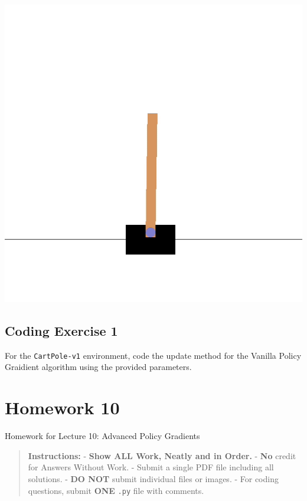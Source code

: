 \documentclass[
  letterpaper,
  DIV=11,
  numbers=noendperiod]{scrreprt}
\makeatletter
\newcommand*\pandocbounded[1]{%
  \sbox\pandoc@box{#1}%
  \Gscale@div\@tempa{\textheight}{\dimexpr\ht\pandoc@box+\dp\pandoc@box\relax}%
  \Gscale@div\@tempb{\linewidth}{\wd\pandoc@box}%
  \ifdim\@tempb\p@<\@tempa\p@\let\@tempa\@tempb\fi%
  \ifdim\@tempa\p@<\p@\scalebox{\@tempa}{\usebox\pandoc@box}%
  \else\usebox{\pandoc@box}%
  \fi%
}
\makeatother
\begin{document}
\begin{center}
\includegraphics[width=0.4\linewidth,height=\textheight,keepaspectratio]{homework/images/cartpole.gif}
\end{center}

\section{Coding Exercise 1}\label{coding-exercise-1-6}

For the \texttt{CartPole-v1} environment, code the update method for the
Vanilla Policy Graidient algorithm using the provided parameters.

\section{\texorpdfstring{\href{https://colab.research.google.com/drive/1Y_A4uKoSmjc6EmU-Or7tbeo3fe_ZD4RH?usp=sharing}{\protect\pandocbounded{}}}{}}\label{section-7}

\chapter{Homework 10}\label{homework-10}

\begin{tcolorbox}[enhanced jigsaw, colback=white, left=2mm, breakable, opacityback=0, bottomrule=.15mm, rightrule=.15mm, arc=.35mm, colframe=quarto-callout-note-color-frame, leftrule=.75mm, toprule=.15mm]

Homework for Lecture 10: Advanced Policy Gradients 📝

\end{tcolorbox}

\begin{quote}
\textbf{Instructions:} - \textbf{Show ALL Work, Neatly and in Order.} -
\textbf{No} credit for Answers Without Work. - Submit a single PDF file
including all solutions. - \textbf{DO NOT} submit individual files or
images. - For coding questions, submit \textbf{ONE} \texttt{.py} file
with comments.
\end{quote}
\end{document}
